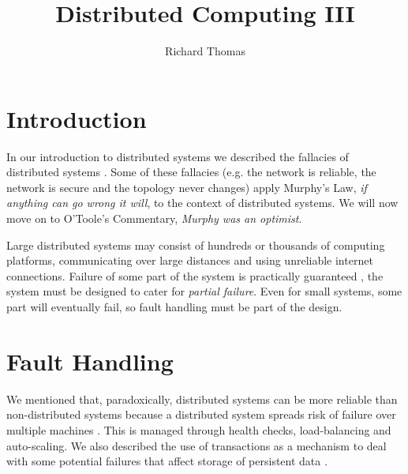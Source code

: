 \title{Distributed Computing III}
\author{Richard Thomas}
\date{}

\maketitle

\section{Introduction}

In our introduction to distributed systems we described the fallacies of distributed systems \cite{distributed1-notes}.
Some of these fallacies (e.g. the network is reliable, the network is secure and the topology never changes)
apply Murphy's Law, \textit{if anything can go wrong it will}, to the context of distributed systems.
We will now move on to O'Toole's Commentary, \textit{Murphy was an optimist}.

Large distributed systems may consist of hundreds or thousands of computing platforms,
communicating over large distances and using unreliable internet connections.
Failure of some part of the system is practically guaranteed \cite{datacenter-computer},
the system must be designed to cater for \emph{partial failure}.
Even for small systems, some part will eventually fail,
so fault handling must be part of the design.


\section{Fault Handling}\label{sec:faults}

We mentioned that, paradoxically, distributed systems can be more reliable than non-distributed systems
because a distributed system spreads risk of failure over multiple machines \cite{distributed1-notes}.
This is managed through health checks, load-balancing and auto-scaling.
We also described the use of transactions as a mechanism to deal with some potential failures
that affect storage of persistent data \cite{distributed2-notes}.

